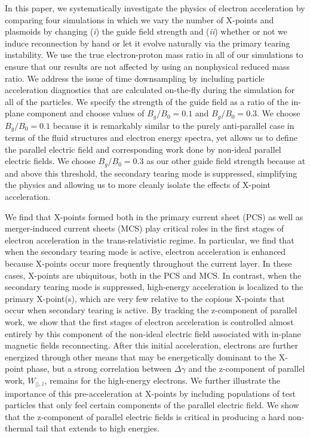 In this paper, we systematically investigate the physics of electron acceleration by comparing four simulations in which we vary the number of X-points and plasmoids by changing (\textit{i}) the guide field strength and (\textit{ii}) whether or not we induce reconnection by hand or let it evolve naturally via the primary tearing instability.  We use the true electron-proton mass ratio in all of our simulations to ensure that our results are not affected by using an nonphysical reduced mass ratio.  We address the issue of time downsampling by including particle acceleration diagnostics that are calculated on-the-fly during the simulation for all of the particles.  We specify the strength of the guide field as a ratio of the in-plane component and choose values of $B_{g}/B_{0}=0.1$ and $B_{g}/B_{0}=0.3$.  We choose $B_{g}/B_{0}=0.1$ because it is remarkably similar to the purely anti-parallel case in terms of the fluid structures and electron energy spectra, yet allows us to define the parallel electric field and corresponding work done by non-ideal parallel electric fields.  We choose $B_{g}/B_{0}=0.3$ as our other guide field strength because at and above this threshold, the secondary tearing mode is suppressed, simplifying the physics and allowing us to more cleanly isolate the effects of X-point acceleration.

We find that X-points formed both in the primary current sheet (PCS) as well as merger-induced current sheets (MCS) play critical roles in the first stages of electron acceleration in the trans-relativistic regime.  In particular, we find that when the secondary tearing mode is active, electron acceleration is enhanced because X-points occur more frequently throughout the current layer.  In these cases, X-points are ubiquitous, both in the PCS and MCS.  In contrast, when the secondary tearing mode is suppressed, high-energy acceleration is localized to the primary X-point(s), which are very few relative to the copious X-points that occur when secondary tearing is active.  By tracking the z-component of parallel work, we show that the first stages of electron acceleration is controlled almost entirely by this component of the non-ideal electric field associated with in-plane magnetic fields reconnecting.  After this initial acceleration, electrons are further energized through other means that may be energetically dominant to the X-point phase, but a strong correlation between $\Delta\gamma$ and the z-component of parallel work, $W_{||,z}$, remains for the high-energy electrons.  We further illustrate the importance of this pre-acceleration at X-points by including populations of test particles that only feel certain components of the parallel electric field.  We show that the z-component of parallel electric fields is critical in producing a hard non-thermal tail that extends to high energies.

